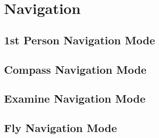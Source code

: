 
\section{Navigation}

\subsection{1st Person Navigation Mode}

\subsection{Compass Navigation Mode}

\subsection{Examine Navigation Mode}

\subsection{Fly Navigation Mode}

